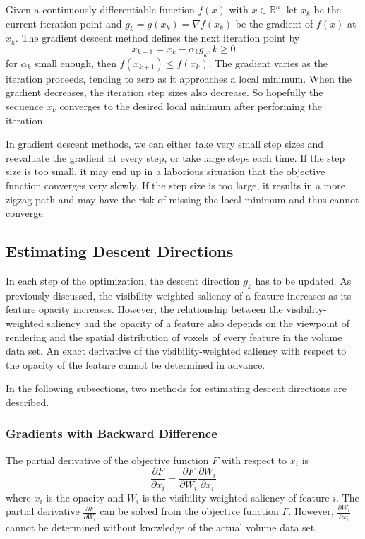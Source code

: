 Given a continuously differentiable function $ f(x) $ with $ x \in \mathbb{R}^{n} $, let $ x_{k} $ be the current iteration point and $ g_{k}=g(x_{k})= \nabla f(x_{k}) $ be the gradient of $ f(x) $ at $ x_{k} $. The gradient descent method defines the next iteration point by
\[ x_{k+1}=x_{k}- \alpha_{k} g_{k} , k \geq 0 \]
for $ \alpha_{k} $ small enough, then $ f(x_{k+1}) \leq f(x_{k}) $. The gradient varies as the iteration proceeds, tending to zero as it approaches a local minimum. When the gradient decreases, the iteration step sizes also decrease. So hopefully the sequence $ {x_{k}} $ converges to the desired local minimum after performing the iteration.

In gradient descent methods, we can either take very small step sizes and reevaluate the gradient at every step, or take large steps each time. If the step size is too small, it may end up in a laborious situation that the objective function converges very slowly. If the step size is too large, it results in a more zigzag path and may have the risk of missing the local minimum and thus cannot converge.

\subsection{Estimating Descent Directions \label{estimating_descent_directions}}
In each step of the optimization, the descent direction $ g_{k} $ has to be updated. 
As previously discussed, the visibility-weighted saliency of a feature increases as its feature opacity increases. 
However, the relationship between the visibility-weighted saliency and the opacity of a feature also depends on the viewpoint of rendering and the spatial distribution of voxels of every feature in the volume data set. An exact derivative of the visibility-weighted saliency with respect to the opacity of the feature cannot be determined in advance.

In the following subsections, two methods for estimating descent directions are described.

\subsubsection{Gradients with Backward Difference}
The partial derivative of the objective function $ F $ with respect to $ x_{i} $ is
\[ \frac{\partial F}{\partial x_{i}} = \frac{\partial F}{\partial W_{i}} \frac{\partial W_{i}}{\partial x_{i}} \]
where $ x_{i} $ is the opacity and $ W_{i} $ is the visibility-weighted saliency of feature $ i $.
The partial derivative $ \frac{\partial F}{\partial W_{i}} $ can be solved from the objective function $ F $.
However, $ \frac{\partial W_{i}}{\partial x_{i}} $ cannot be determined without knowledge of the actual volume data set.

